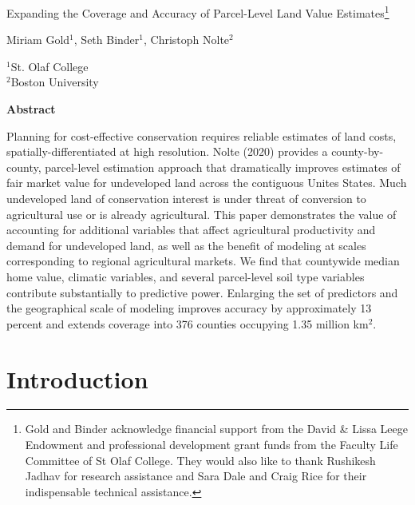 \documentclass[12pt]{article}
\begin{document}
\hspace{5pt}

\Large
 \begin{center}
Expanding the Coverage and Accuracy of Parcel-Level Land Value Estimates\footnote[2]{Gold and Binder acknowledge financial support from the David \& Lissa Leege Endowment and professional development grant funds from the Faculty Life Committee of St Olaf College. They would also like to thank Rushikesh Jadhav for research assistance and Sara Dale and Craig Rice for their indispensable technical assistance.}\\ 

\vspace{10pt}

\large
Miriam Gold$^1$, Seth Binder$^1$, Christoph Nolte$^2$ \\

\vspace{10pt}

\footnotesize  
$^{1}$St. Olaf College\\
$^2$Boston University

\vspace{40pt} 

    \normalsize
    \textbf{Abstract}
\end{center}

\small
Planning for cost-effective conservation requires reliable estimates of land costs, spatially-differentiated at high resolution. Nolte (2020) provides a county-by-county, parcel-level estimation approach that dramatically improves estimates of fair market value for undeveloped land across the contiguous Unites States. Much undeveloped land of conservation interest is under threat of conversion to agricultural use or is already agricultural. This paper demonstrates the value of accounting for additional variables that affect agricultural productivity and demand for undeveloped land, as well as the benefit of modeling at scales corresponding to regional agricultural markets. We find that countywide median home value, climatic variables, and several parcel-level soil type variables contribute substantially to predictive power. Enlarging the set of predictors and the geographical scale of modeling improves accuracy by approximately 13 percent and extends coverage into 376 counties occupying 1.35 million km$^2$.

\newpage

\section{Introduction}
\end{document}
